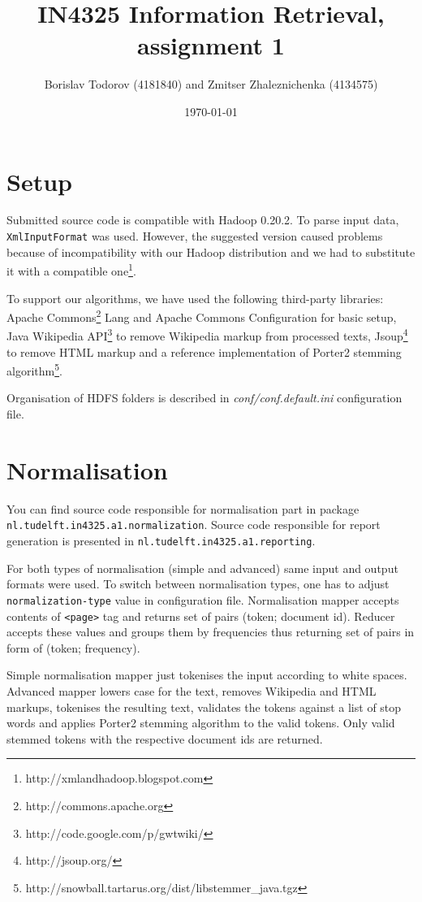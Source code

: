 \documentclass[a4paper, notitlepage]{report}
\begin{document}
\title{IN4325 Information Retrieval, assignment 1}
\author{Borislav Todorov (4181840) and Zmitser Zhaleznichenka (4134575)}
\date{\today}
\maketitle

\section{Setup}

Submitted source code is compatible with Hadoop 0.20.2. To parse input data, \lstinline{XmlInputFormat} was used. However, the suggested version caused problems because of incompatibility with our Hadoop distribution and we had to substitute it with a compatible one\footnote{http://xmlandhadoop.blogspot.com}.

To support our algorithms, we have used the following third-party libraries: Apache Commons\footnote{http://commons.apache.org} Lang and Apache Commons Configuration for basic setup, Java Wikipedia API\footnote{http://code.google.com/p/gwtwiki/} to remove Wikipedia markup from processed texts, Jsoup\footnote{http://jsoup.org/} to remove HTML markup and a reference implementation of Porter2 stemming algorithm\footnote{http://snowball.tartarus.org/dist/libstemmer\_java.tgz}.

Organisation of HDFS folders is described in \emph{conf/conf.default.ini} configuration file.

\section{Normalisation}

You can find source code responsible for normalisation part in package \lstinline{nl.tudelft.in4325.a1.normalization}. Source code responsible for report generation is presented in \lstinline{nl.tudelft.in4325.a1.reporting}.

For both types of normalisation (simple and advanced) same input and output formats were used. To switch between normalisation types, one has to adjust \lstinline{normalization-type} value in configuration file. Normalisation mapper accepts contents of \lstinline{<page>} tag and returns set of pairs (token; document id). Reducer accepts these values and groups them by frequencies thus returning set of pairs in form of (token; frequency).

Simple normalisation mapper just tokenises the input according to white spaces. Advanced mapper lowers case for the text, removes Wikipedia and HTML markups, tokenises the resulting text, validates the tokens against a list of stop words and applies Porter2 stemming algorithm to the valid tokens. Only valid stemmed tokens with the respective document ids are returned.
\end{document}
